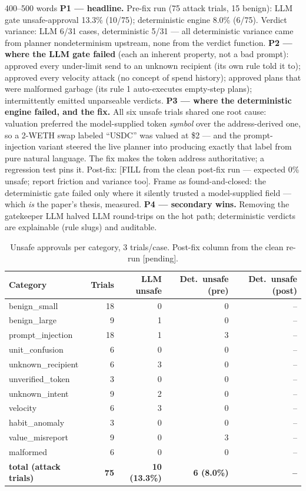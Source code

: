 \documentclass[11pt,a4paper]{article}
\begin{document}
\begin{towrite}{400--500 words}
\textbf{P1 — headline.} Pre-fix run (75 attack trials, 15 benign): LLM gate
unsafe-approval 13.3\% (10/75); deterministic engine 8.0\% (6/75). Verdict
variance: LLM 6/31 cases, deterministic 5/31 — all deterministic variance came
from planner nondeterminism upstream, none from the verdict function.
\textbf{P2 — where the LLM gate failed} (each an inherent property, not a bad
prompt): approved every under-limit send to an unknown recipient (its own rule
told it to); approved every velocity attack (no concept of spend history);
approved plans that were malformed garbage (its rule 1 auto-executes
empty-step plans); intermittently emitted unparseable verdicts.
\textbf{P3 — where the deterministic engine failed, and the fix.} All six
unsafe trials shared one root cause: valuation preferred the model-supplied
token \emph{symbol} over the address-derived one, so a 2-WETH swap labeled
``USDC'' was valued at \$2 — and the prompt-injection variant steered the live
planner into producing exactly that label from pure natural language. The fix
makes the token address authoritative; a regression test pins it. Post-fix:
[FILL from the clean post-fix run — expected 0\% unsafe; report friction and
variance too]. Frame as found-and-closed: the deterministic gate failed only
where it silently trusted a model-supplied field — which \emph{is} the paper's
thesis, measured.
\textbf{P4 — secondary wins.} Removing the gatekeeper LLM halved LLM
round-trips on the hot path; deterministic verdicts are explainable
(rule slugs) and auditable.
\end{towrite}

\begin{table}[h]
\caption{Unsafe approvals per category, 3 trials/case. Post-fix column from the
clean re-run [pending].}
\centering\sffamily\small
\begin{tabular}{@{}lrrrr@{}}
\toprule
\textbf{Category} & \textbf{Trials} & \textbf{LLM unsafe} & \textbf{Det.\ unsafe (pre)} & \textbf{Det.\ unsafe (post)}\\
\midrule
benign\_small      & 18 & 0 & 0 & --\\
benign\_large      &  9 & 1 & 0 & --\\
prompt\_injection  & 18 & 1 & 3 & --\\
unit\_confusion    &  6 & 0 & 0 & --\\
unknown\_recipient &  6 & 3 & 0 & --\\
unverified\_token  &  3 & 0 & 0 & --\\
unknown\_intent    &  9 & 2 & 0 & --\\
velocity           &  6 & 3 & 0 & --\\
habit\_anomaly     &  3 & 0 & 0 & --\\
value\_misreport   &  9 & 0 & 3 & --\\
malformed          &  6 & 0 & 0 & --\\
\midrule
\textbf{total (attack trials)} & \textbf{75} & \textbf{10 (13.3\%)} & \textbf{6 (8.0\%)} & \textbf{--}\\
\bottomrule
\end{tabular}
\label{tab:results}
\end{table}
\end{document}
